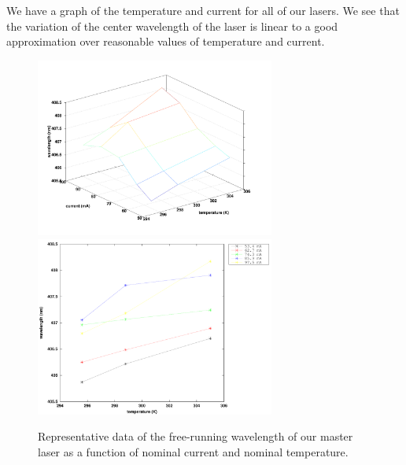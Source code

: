 We have a graph of the temperature and current for all of our lasers. We see that the variation of the center wavelength of the laser is linear to a good approximation over reasonable values of temperature and current.

\begin{figure}
\centering
\includegraphics[width=0.7\textwidth]{TVlambda3} 
\includegraphics[width=0.7\textwidth]{TVlambda2}
\caption[Graph of Temperatures and Currents]{\label{3dCurrentandTgraph} Representative data of the free-running wavelength of our master laser as a function of nominal current and nominal temperature.}
\end{figure}


